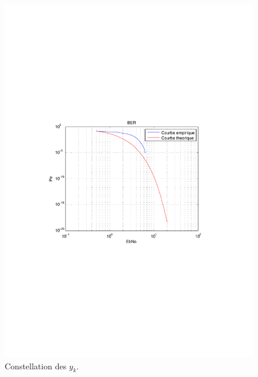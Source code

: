 \documentclass[a4paper,11pt]{article}
\begin{document}
\begin{figure}
	\begin{center}
	\includegraphics[scale=0.5]{Q14-BER.pdf}
	\caption{Constellation des $y_k$.}
	\label{fig:q14}
	\end{center}
\end{figure}  
\end{document}
